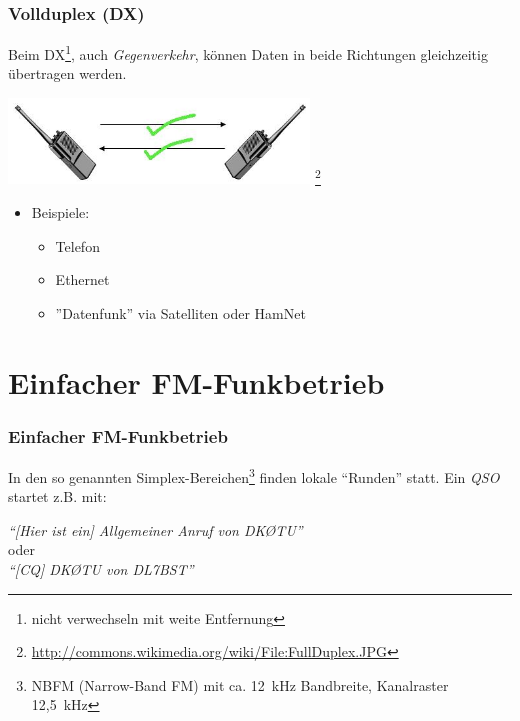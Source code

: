 \begin{frame}
    \frametitle{Vollduplex (DX)}

    Beim DX\footnote{nicht verwechseln mit weite Entfernung}, auch
    \emph{Gegenverkehr}, können Daten in beide Richtungen gleichzeitig
    übertragen werden. \\[1em]

    \begin{center}
        \includegraphics[width=0.6\textwidth]{bv11/FullDuplex.jpg}
        \footnote{\tiny \url{http://commons.wikimedia.org/wiki/File:FullDuplex.JPG}}
    \end{center}

    \begin{itemize}
        \item Beispiele:
        \begin{itemize}
            \item Telefon
            \item Ethernet
            \item ''Datenfunk'' via Satelliten oder HamNet
        \end{itemize}
    \end{itemize}

\end{frame}

\section[FM-Funkbetrieb]{Einfacher FM-Funkbetrieb}

\begin{frame}
    \frametitle{Einfacher FM-Funkbetrieb}

    In den so genannten Simplex-Bereichen\footnote{NBFM (Narrow-Band FM) mit ca. 12~kHz
    Bandbreite, Kanalraster 12,5~kHz} finden lokale ``Runden'' statt.
    Ein \emph{QSO} startet z.B. mit: \\[2em]

    \begin{center}
        \Large \emph{``[Hier ist ein] Allgemeiner Anruf von DKØTU''} \\[1em]
        \normalsize oder \\[1em]
        \Large \emph{``[CQ] DKØTU von DL7BST''}
    \end{center}

\end{frame}

